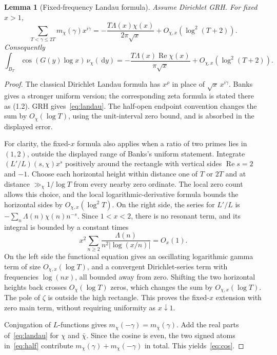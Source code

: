 \documentclass[11pt]{article}
\newtheorem{lemma}[theorem]{Lemma}
\theoremstyle{definition}
\newcommand{\Rea}{\operatorname{Re}}
\newcommand{\dd}{\,\mathrm d}
\newcommand{\abs}[1]{\left|#1\right|}
\begin{document}
\begin{lemma}[Fixed-frequency Landau formula]\label{lem:landau}
Assume Dirichlet GRH. For fixed $x>1$,
\begin{equation}\label{eq:landau}
 \sum_{T<\gamma\le2T}m_\chi(\gamma)x^{i\gamma}
 =-\frac{T\Lambda(x)\chi(x)}{2\pi\sqrt x}
   +O_{\chi,x}(\log^2(T+2)).
\end{equation}
Consequently
\begin{equation}\label{eq:cos}
 \int_{B_T}\cos(G(y)\log x)\,\nu_\chi(\dd y)
 =-\frac{T\Lambda(x)\Rea\chi(x)}{\pi\sqrt x}
   +O_{\chi,x}(\log^2(T+2)).
\end{equation}
\end{lemma}

\begin{proof}
The classical Dirichlet Landau formula has $x^\rho$ in place of
$\sqrt x\,x^{i\gamma}$. Banks~\cite[Theorem~1.2]{Banks} gives a stronger
uniform version; the corresponding zeta formula is stated there as (1.2).
GRH gives~\eqref{eq:landau}. The half-open endpoint convention changes the sum
by $O_\chi(\log T)$, using the unit-interval zero bound, and is absorbed in the
displayed error.

For clarity, the fixed-$x$ formula also applies when a ratio of two primes lies
in $(1,2)$, outside the displayed range of Banks's uniform statement. Integrate
$(L'/L)(s,\chi)x^s$ positively around the rectangle with vertical sides
$\Rea s=2$ and $-1$. Choose each horizontal height within distance one of
$T$ or $2T$ and at distance $\gg_\chi1/\log T$ from every nearby zero
ordinate. The local zero count allows this choice, and the local
logarithmic-derivative formula bounds the horizontal sides by
$O_{\chi,x}(\log^2 T)$. On the right side, the series for $L'/L$ is
$-\sum_n\Lambda(n)\chi(n)n^{-s}$. Since $1<x<2$, there is no resonant term,
and its integral is bounded by a constant times
\[
 x^2\sum_{n\ge2}\frac{\Lambda(n)}{n^2\abs{\log(x/n)}}=O_x(1).
\]
On the left side the functional equation gives an oscillating logarithmic
gamma term of size $O_{\chi,x}(\log T)$, and a convergent Dirichlet-series
term with frequencies $\log(nx)$, all bounded away from zero. Shifting the
two horizontal heights back crosses $O_\chi(\log T)$ zeros, which changes
the sum by $O_{\chi,x}(\log T)$. The pole of $\zeta$ is outside the high
rectangle. This proves the fixed-$x$ extension with zero main term, without
requiring uniformity as $x\downarrow1$.

Conjugation of $L$-functions gives $m_\chi(-\gamma)=m_{\bar\chi}(\gamma)$.
Add the real parts of~\eqref{eq:landau} for $\chi$ and $\bar\chi$.
Since the cosine is even, the two signed atoms in~\eqref{eq:half} contribute
$m_\chi(\gamma)+m_\chi(-\gamma)$ in total. This yields~\eqref{eq:cos}.
\end{proof}
\end{document}
